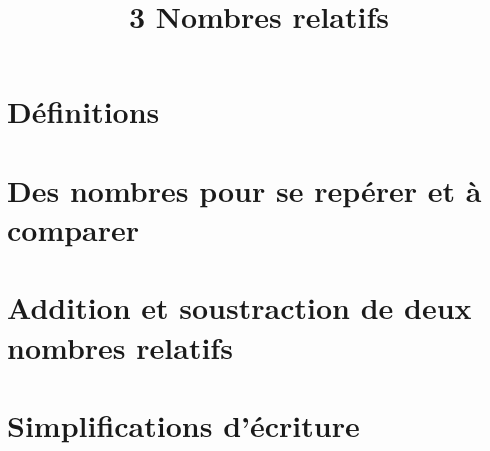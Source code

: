 \documentclass[12pt,a4paper]{article}
\date{}
\title{\textcircled{{\normalsize{3}}} Nombres relatifs}
\begin{document}
	
	\maketitle



\section{Définitions}



\newpage
\section{Des nombres pour se repérer et à comparer}



 \newpage
 
\section{Addition et soustraction de deux nombres relatifs}



\newpage

\section{Simplifications d'écriture}


\end{document}
